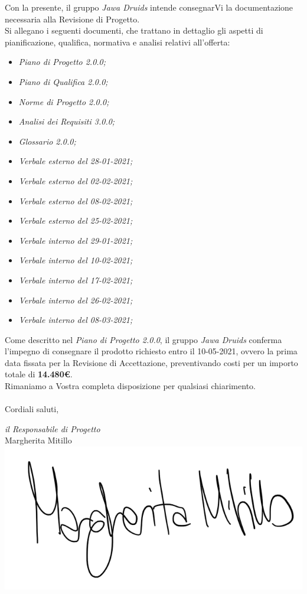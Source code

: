 \documentclass[a4paper,12pt]{report}
\begin{document}
Con la presente, il gruppo \textit{Jawa Druids} intende consegnarVi la documentazione necessaria alla Revisione di Progetto.
\vspace{1cm}
\\
Si allegano i seguenti documenti, che trattano in dettaglio gli aspetti di pianificazione, qualifica, normativa e analisi relativi all'offerta:
\begin{itemize}
  \item \textit{Piano di Progetto 2.0.0;}
  \item \textit{Piano di Qualifica 2.0.0;}
  \item \textit{Norme di Progetto 2.0.0;}
  \item \textit{Analisi dei Requisiti 3.0.0;}
  \item \textit{Glossario 2.0.0;}
  \item \textit{Verbale esterno del 28-01-2021;}
  \item \textit{Verbale esterno del 02-02-2021;}
  \item \textit{Verbale esterno del 08-02-2021;}
  \item \textit{Verbale esterno del 25-02-2021;}
  \item \textit{Verbale interno del 29-01-2021;}
  \item \textit{Verbale interno del 10-02-2021;}
  \item \textit{Verbale interno del 17-02-2021;}
  \item \textit{Verbale interno del 26-02-2021;}
  \item \textit{Verbale interno del 08-03-2021;}
\end{itemize}
\vspace{0.7cm}

Come descritto nel \textit{Piano di Progetto 2.0.0}, il gruppo \textit{Jawa Druids} conferma l’impegno di consegnare il prodotto richiesto entro il 10-05-2021, ovvero la prima data fissata per la Revisione di Accettazione, preventivando costi per un importo totale di \textbf{14.480\euro}.\\
Rimaniamo a Vostra completa disposizione per qualsiasi chiarimento.\\
\vspace{0.3cm}
\\
Cordiali saluti,
\begin{flushright}
  \textit{il Responsabile di Progetto} \\
  Margherita Mitillo \\
  \includegraphics[width=0.3\linewidth]{immagini/firme/firma_margherita.png}\\[4ex]
\end{flushright}
\end{document}
